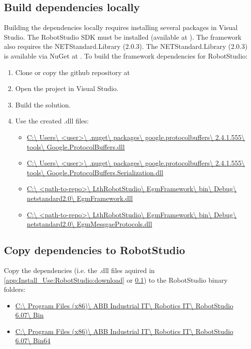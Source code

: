 \documentclass{cslthse-msc}
\begin{document}
\begin{appendices}
\subsection{Build dependencies locally}
\label{app:Install_Use:RobotStudio:build}
Building the dependencies locally requires installing several packages in Visual Studio. The RobotStudio SDK must be installed (available at \cite{ABB:RS_SDK}). The framework also requires the NETStandard.Library (2.0.3). The NETStandard.Library (2.0.3) is available via NuGet at \cite{Microsoft:DNet}. To build the framework dependencies for RobotStudio:
\begin{enumerate}
    \item Clone or copy the github repository at \cite{Greg:LthRobotStudio}
    \item Open the project in Visual Studio.
    \item Build the solution.
    \item Use the created .dll files:
        \begin{itemize}
            \item \url{C:\ Users\ <user>\ .nuget\ packages\ google.protocolbuffers\ 2.4.1.555\ tools\ Google.ProtocolBuffers.dll}
            \item \url{C:\ Users\ <user>\ .nuget\ packages\ google.protocolbuffers\ 2.4.1.555\ tools\ Google.ProtocolBuffers.Serialization.dll}
            \item \url{C:\ <path-to-repo>\ LthRobotStudio\ EgmFramework\ bin\ Debug\ netstandard2.0\ EgmFramework.dll}
            \item \url{C:\ <path-to-repo>\ LthRobotStudio\ EgmFramework\ bin\ Debug\ netstandard2.0\ EgmMessgaeProtocols.dll}
        \end{itemize}
\end{enumerate}

\subsection{Copy dependencies to RobotStudio}
\label{app:Install_Use:RobotStudio:copy_to_RS}
Copy the dependencies (i.e. the .dll files aquired in \ref{app:Install_Use:RobotStudio:download} or \ref{app:Install_Use:RobotStudio:build}) to the RobotStudio binary folders:
\begin{itemize}
    \item \url{C:\ Program Files (x86)\ ABB Industrial IT\ Robotics IT\ RobotStudio 6.07\ Bin}
    \item \url{C:\ Program Files (x86)\ ABB Industrial IT\ Robotics IT\ RobotStudio 6.07\ Bin64}
\end{itemize}


\end{appendices}
\end{document}
